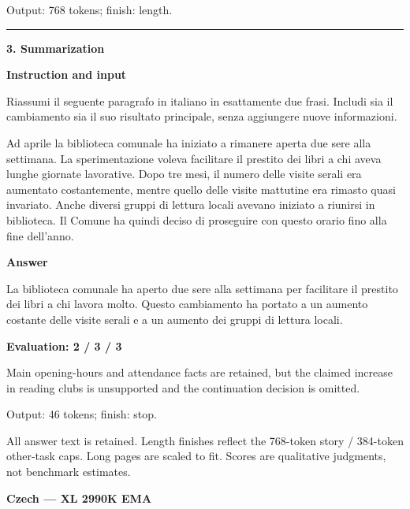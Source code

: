 \documentclass[10pt]{article}
\begin{document}
{\begin{minipage}{\textwidth}
\par {\color{gray} Output: 768 tokens; finish: length.}\par
\medskip\hrule\smallskip
{\bfseries 3. Summarization}\par\smallskip
\textbf{Instruction and input}\par Riassumi il seguente paragrafo in italiano in esattamente due frasi. Includi sia il cambiamento sia il suo risultato principale, senza aggiungere nuove informazioni.
\par\smallskip
Ad aprile la biblioteca comunale ha iniziato a rimanere aperta due sere alla settimana. La sperimentazione voleva facilitare il prestito dei libri a chi aveva lunghe giornate lavorative. Dopo tre mesi, il numero delle visite serali era aumentato costantemente, mentre quello delle visite mattutine era rimasto quasi invariato. Anche diversi gruppi di lettura locali avevano iniziato a riunirsi in biblioteca. Il Comune ha quindi deciso di proseguire con questo orario fino alla fine dell'anno.\par\smallskip
\textbf{Answer}\par La biblioteca comunale ha aperto due sere alla settimana per facilitare il prestito dei libri a chi lavora molto. Questo cambiamento ha portato a un aumento costante delle visite serali e a un aumento dei gruppi di lettura locali.\par\smallskip
\textbf{Evaluation: 2 / 3 / 3}\par Main opening-hours and attendance facts are retained, but the claimed increase in reading clubs is unsupported and the continuation decision is omitted.
\par {\color{gray} Output: 46 tokens; finish: stop.}\par
\medskip\footnotesize All answer text is retained. Length finishes reflect the 768-token story / 384-token other-task caps. Long pages are scaled to fit. Scores are qualitative judgments, not benchmark estimates.
\end{minipage}}%
\noindent\ifdim\dimexpr\ht\languagepage+\dp\languagepage\relax>0.93\textheight%
\resizebox*{!}{0.93\textheight}{\usebox{\languagepage}}%
\else\usebox{\languagepage}\fi%
\clearpage
{\Large\bfseries Czech --- XL 2990K EMA}\par\smallskip
\end{document}

